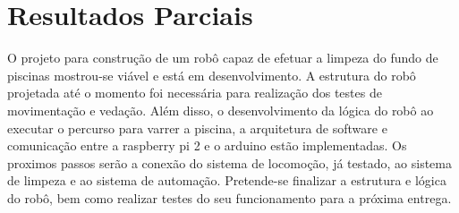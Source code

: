 \chapter{Resultados Parciais}
O projeto para construção de um robô capaz de efetuar a limpeza do fundo de piscinas mostrou-se viável e está em desenvolvimento. A estrutura do robô projetada até o momento foi necessária para realização dos testes de movimentação e vedação. Além disso, o desenvolvimento da lógica do robô ao executar o percurso para varrer a piscina, a arquitetura de software e comunicação entre a raspberry pi 2 e o arduino estão implementadas. Os proximos passos serão a conexão do sistema de locomoção, já testado, ao sistema de limpeza e ao sistema de automação. Pretende-se finalizar a estrutura e lógica do robô, bem como realizar testes do seu funcionamento para a próxima entrega.